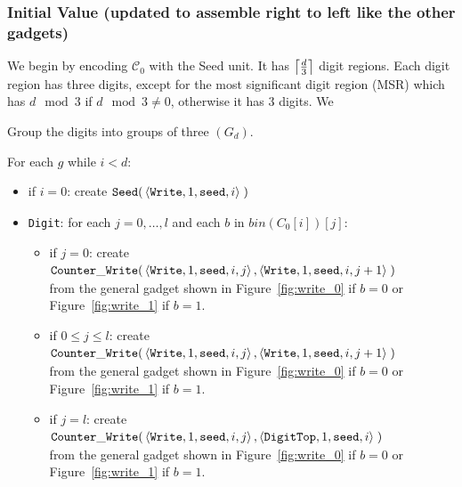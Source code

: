 \subsubsection{Initial Value (updated to assemble right to left like the other gadgets)}
We begin by encoding $\mathcal{C}_0$ with the Seed unit. It has $\ceil*{\frac{d}{3}}$ digit regions.
Each digit region has three digits, except for the most significant digit region (MSR) which has $d \mod 3$
if $d \mod 3 \not= 0$, otherwise it has 3 digits. We

Group the digits into groups of three $(G_d)$.

%

For each $g$ while $i < d$:

\begin{itemize}
    \item if $i = 0$: create
    $\begin{aligned}[t]
        {\tt Seed}(&\left\langle {\tt Write}, 1, {\tt seed}, i \right\rangle \; )
    \end{aligned}$

    \item {\tt Digit}: for each $j=0,\ldots,l$ and each $b$ in $bin(C_0[i])[j]$:
    \begin{itemize}
        \item if $j = 0$: create
        $\begin{aligned}[t]
            \dwriter(&\left\langle {\tt Write}, 1, {\tt seed}, i, j \right\rangle, \left\langle {\tt Write}, 1, {\tt seed}, i, j + 1  \right\rangle \;)
        \end{aligned}$\\from the general gadget shown in Figure~\ref{fig:write_0} if $b = 0$ or Figure~\ref{fig:write_1} if $b = 1$.

        \item if $0 \leqslant j \leqslant l$: create
        $\begin{aligned}[t]
            \dwriter(&\left\langle {\tt Write}, 1, {\tt seed}, i, j \right\rangle, \left\langle {\tt Write}, 1, {\tt seed}, i, j + 1 \right\rangle \;)
        \end{aligned}$\\from the general gadget shown in Figure~\ref{fig:write_0} if $b = 0$ or Figure~\ref{fig:write_1} if $b = 1$.

        \item if $j = l$: create
        $\begin{aligned}[t]
            \dwriter(&\left\langle {\tt Write}, 1, {\tt seed}, i, j \right\rangle, \left\langle {\tt DigitTop}, 1, {\tt seed}, i \right\rangle \;)
        \end{aligned}$\\from the general gadget shown in Figure~\ref{fig:write_0} if $b = 0$ or Figure~\ref{fig:write_1} if $b = 1$.
    \end{itemize}



\end{itemize}
